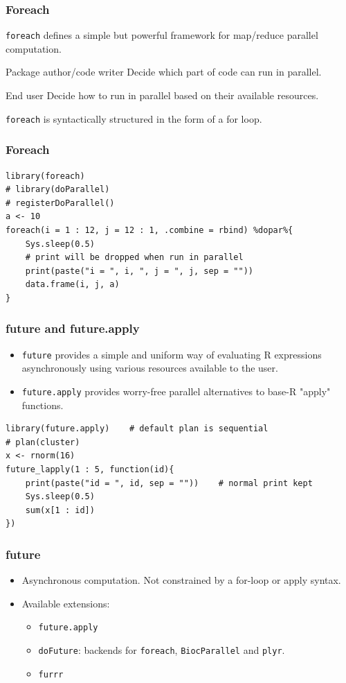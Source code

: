 \documentclass[aspectratio=169,xcolor={dvipsnames,table}]{beamer}
\begin{document}
\begin{frame}[fragile]
  \frametitle{Foreach}
  \texttt{foreach} defines a simple but powerful framework for map/reduce parallel computation.
  \begin{block}{Package author/code writer}
    Decide {\color{Brown}which part of code} can run in parallel.
  \end{block}
  \begin{block}{End user}
    Decide {\color{Brown}how} to run in parallel based on their available resources.
  \end{block}
  \texttt{foreach} is syntactically structured in the form of a for loop.
\end{frame}

\begin{frame}[fragile]
  \frametitle{Foreach}
\begin{verbatim}
library(foreach)
# library(doParallel)
# registerDoParallel()
a <- 10
foreach(i = 1 : 12, j = 12 : 1, .combine = rbind) %dopar%{
    Sys.sleep(0.5)
    # print will be dropped when run in parallel
    print(paste("i = ", i, ", j = ", j, sep = ""))
    data.frame(i, j, a)
}
\end{verbatim}
\end{frame}

\begin{frame}[fragile]
  \frametitle{future and future.apply}
  \begin{itemize}
  \item \texttt{future} provides a simple and uniform way of evaluating R expressions asynchronously using various resources available to the user.
  \item \texttt{future.apply} provides worry-free parallel alternatives to base-R "apply" functions.
  \end{itemize}
\begin{verbatim}
library(future.apply)    # default plan is sequential
# plan(cluster)
x <- rnorm(16)
future_lapply(1 : 5, function(id){
    print(paste("id = ", id, sep = ""))    # normal print kept
    Sys.sleep(0.5)
    sum(x[1 : id])
})
\end{verbatim}
\end{frame}

\begin{frame}[fragile]
  \frametitle{future}
  \begin{itemize}
  \item Asynchronous computation. Not constrained by a for-loop or apply syntax.
  \item Available extensions:
    \begin{itemize}
    \item \texttt{future.apply}
    \item \texttt{doFuture}: backends for \texttt{foreach}, \texttt{BiocParallel} and \texttt{plyr}.
    \item \texttt{furrr}
    \end{itemize}
  \end{itemize}
\end{frame}
\end{document}
